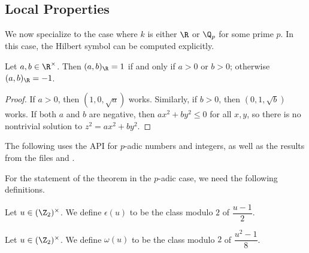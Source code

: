 \subsection{Local Properties}
We now specialize to the case where $k$ is either $\R$ or $\Q_p$ for some prime $p$. In this case, the Hilbert symbol can be computed explicitly.

\begin{theorem}
	\label{thm:real}
	\leanok
	Let $a, b \in \R^\times$. Then $(a, b)_{\R} = 1$ if and only if $a > 0$ or $b > 0$; otherwise $(a, b)_{\R} = -1$.
\end{theorem}

\begin{proof}
	If $a>0$, then $(1,0,\sqrt{a})$ works. Similarly, if $b>0$, then $(0,1,\sqrt{b})$ works.
	If both $a$ and $b$ are negative, then $ax^2 + by^2 \le 0$ for all $x,y$, so there is no
	nontrivial solution to $z^2 = ax^2 + by^2$.
\end{proof}

The following uses the \mathlib API for $p$-adic numbers and integers, as well as the results from the files  and .


For the statement of the theorem in the $p$-adic case, we need the following definitions.


\begin{definition}
	\label{def:epsilon}
	\leanok
	Let $u \in (\Z_2)^\times$. We define $\epsilon(u)$ to be the class modulo $2$ of $\dfrac{u-1}{2}$.
\end{definition}

\begin{definition}
	\label{def:omega}
	\leanok
	Let $u \in (\Z_2)^\times$. We define $\omega(u)$ to be the class modulo $2$ of $\dfrac{u^2-1}{8}$.
\end{definition}



